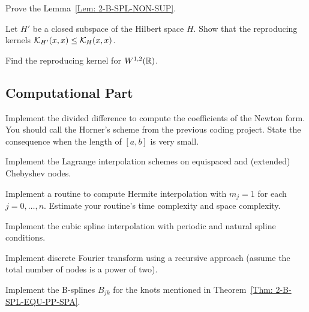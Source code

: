 \begin{problem}
\label{Prb: 2-B-SPL-NON-SUP}
    Prove the Lemma~\ref{Lem: 2-B-SPL-NON-SUP}.
\end{problem}
\begin{problem}
\label{Exer:2-Rep-Ker-Ine}
    Let $H'$ be a closed subspace of the Hilbert space $H$. Show that the reproducing kernels $\mathcal K_{H'}(x, x) \le \mathcal K_{H}(x, x)$. 
\end{problem}
\begin{problem}
    Find the reproducing kernel for $W^{1,2}(\mathbb R)$. 
\end{problem}
\subsection{Computational Part}
\begin{problem}
    Implement the divided difference to compute the coefficients of the Newton form. You should call the Horner's scheme from the previous coding project. State the consequence when the length of $[a, b]$ is very small. 
\end{problem}
\begin{problem}
    Implement the Lagrange interpolation schemes on equispaced and (extended) Chebyshev nodes.
\end{problem}
\begin{problem}
    Implement a routine to compute Hermite interpolation with $m_j = 1$ for each $j = 0, \dots, n$. Estimate your routine's time complexity and space complexity. 
\end{problem}
\begin{problem}
    Implement the cubic spline interpolation with periodic and natural spline conditions. 
\end{problem}

\begin{problem}
     Implement discrete Fourier transform using a recursive approach (assume the total number of nodes is a power of two).
\end{problem}

\begin{problem}
    Implement the B-splines $B_{jk}$ for the knots mentioned in Theorem~\ref{Thm: 2-B-SPL-EQU-PP-SPA}.
\end{problem}

% 
\nocite{jackson1912approximation, jackson1913accuracy, erdHos1964problems,erdos1958problems,de1978practical,prenter2008splines,trefethen1991two}


